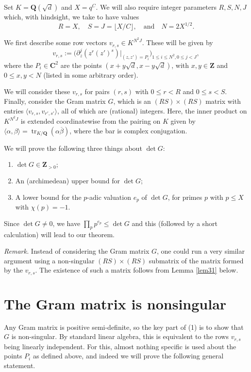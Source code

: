 \documentclass[11pt,reqno]{amsart}
\numberwithin{equation}{section}
\newcommand{\Z}{\mathbf{Z}}
\newcommand{\Q}{\mathbf{Q}}
\newcommand{\C}{\mathbf{C}}
\renewcommand{\le}{\leqslant}
\begin{document}
Set $K = \Q(\sqrt{d})$ and $X = q^{C}$. We will also require integer parameters $R, S, N, J$ which, with hindsight, we take to have values
\begin{equation}\label{parameters} R = X,\quad S =  J = \lfloor X/C\rfloor, \quad \mbox{and} \quad N = 2X^{1/2}. \end{equation} 

We first describe some row vectors $v_{r,s} \in K^{N^2 J}$. These will be given by 
\[ v_{r,s} := \big( \partial_z^j (z^r (z')^s)|_{(z,z') = P_i}\big)_{1 \le i \le N^2, 0 \le j < J} ,\] where the $P_i \in \C^2$ are the points $(x + y \sqrt{d}, x - y \sqrt{d})$, with $x, y \in \Z$ and $0 \le x, y < N$ (listed in some arbitrary order).

We will consider these $v_{r,s}$ for pairs $(r,s)$ with $0 \le r < R$ and $0 \le s < S$. Finally, consider the Gram matrix $G$, which is an $(RS) \times (RS)$ matrix with entries $\langle v_{r,s}, v_{r', s'}\rangle$, all of which are (rational) integers. Here, the inner product on $K^{N^2 J}$ is extended coordinatewise from the pairing on $K$ given by $\langle \alpha, \beta\rangle = \operatorname{tr}_{K/\Q}(\alpha \overline{\beta})$, where the bar is complex conjugation.

We will prove the following three things about $\det G$:

\begin{enumerate}
\item $\det G \in \Z_{> 0}$;
\item An (archimedean) upper bound for $\det G$;
\item A lower bound for the $p$-adic valuation $e_p$ of $\det G$, for primes $p$ with $p \le X$ with $\chi(p) = -1$.
\end{enumerate}
Since $\det G \ne 0$, we have $\prod_p p^{e_p} \le \det G$ and this (followed by a short calculation) will lead to our theorem. \vspace*{8pt}

\emph{Remark.} Instead of considering the Gram matrix $G$, one could run a very similar argument using a non-singular $(RS) \times (RS)$ submatrix of the matrix formed by the $v_{r,s}$. The existence of such a matrix follows from Lemma \ref{lem31} below.

\section{The Gram matrix is nonsingular}

Any Gram matrix is positive semi-definite, so the key part of (1) is to show that $G$ is non-singular. By standard linear algebra, this is equivalent to the rows $v_{r,s}$ being linearly independent. For this, almost nothing specific is used about the points $P_i$ as defined above, and indeed we will prove the following general statement.
 
\end{document}
